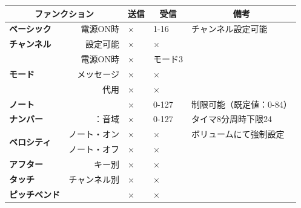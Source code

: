 \documentclass[a4paper,11pt]{jsarticle}
\newcommand{\midFalse}{×}
\begin{document}
\begin{table}[htbp]
\begin{center}
\begin{tabular}{ | p{2cm} p{2cm} | p{4cm} | p{4cm} | p{4cm} | }
\hline
\multicolumn{2}{|c|}{\textbf{\large ファンクション}} & 
\multicolumn{1}{c|}{\textbf{\large 送信}} & 
\multicolumn{1}{c|}{\textbf{\large 受信}} & 
\multicolumn{1}{c|}{\textbf{\large 備考}} \\\hline


\textbf{ベーシック} & \multicolumn{1}{r|}{電源ON時} & \midFalse & 1-16 & チャンネル設定可能 \\
\textbf{チャンネル} & \multicolumn{1}{r|}{設定可能} & \midFalse & \midFalse & \\\hline

 & \multicolumn{1}{r|}{電源ON時} & \midFalse & モード3 & \\
\textbf{モード} & \multicolumn{1}{r|}{メッセージ} & \midFalse & \midFalse & \\
 & \multicolumn{1}{r|}{代用} & \midFalse & \midFalse & \\\hline

\textbf{ノート} & & \midFalse & 0-127 & 制限可能（既定値：0-84） \\
\textbf{ナンバー} & \multicolumn{1}{r|}{：音域} & \midFalse & 0-127 & タイマ8分周時下限24 \\\hline

\multirow{2}{*}{\textbf{ベロシティ}} & \multicolumn{1}{r|}{ノート・オン} & \midFalse & \midFalse & ボリュームにて強制設定 \\
 & \multicolumn{1}{r|}{ノート・オフ} & \midFalse & \midFalse &  \\\hline

\textbf{アフター} & \multicolumn{1}{r|}{キー別} & \midFalse & \midFalse & \\
\textbf{タッチ} & \multicolumn{1}{r|}{チャンネル別} & \midFalse & \midFalse & \\\hline

\textbf{ピッチベンド} & & \midFalse & \midFalse & \\\hline




\end{tabular}
\end{center}
\end{table}
\thispagestyle{empty}
\restoregeometry
\end{document}
